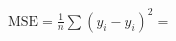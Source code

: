 \documentclass[preview]{standalone}
\begin{document}
\begin{center}
$\text{MSE} = \frac{1}{n} \sum (y_i - \hat{y}_i)^2 = $
\end{center}
\end{document}

